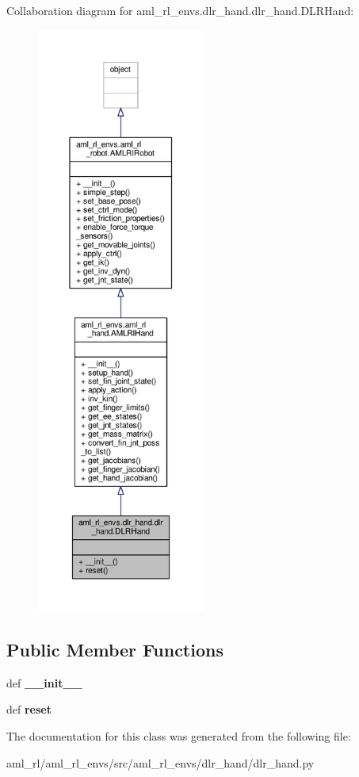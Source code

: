 Collaboration diagram for aml\-\_\-rl\-\_\-envs.\-dlr\-\_\-hand.\-dlr\-\_\-hand.\-D\-L\-R\-Hand\-:
\nopagebreak
\begin{figure}[H]
\begin{center}
\leavevmode
\includegraphics[height=550pt]{classaml__rl__envs_1_1dlr__hand_1_1dlr__hand_1_1_d_l_r_hand__coll__graph}
\end{center}
\end{figure}
\subsection*{Public Member Functions}
\begin{DoxyCompactItemize}
\item 
\hypertarget{classaml__rl__envs_1_1dlr__hand_1_1dlr__hand_1_1_d_l_r_hand_a0dfced3643c6d7d59ca5d88761c02fed}{def {\bfseries \-\_\-\-\_\-init\-\_\-\-\_\-}}\label{classaml__rl__envs_1_1dlr__hand_1_1dlr__hand_1_1_d_l_r_hand_a0dfced3643c6d7d59ca5d88761c02fed}

\item 
\hypertarget{classaml__rl__envs_1_1dlr__hand_1_1dlr__hand_1_1_d_l_r_hand_a85d50e4ae5cdab3bf9dfc4e81dc17d02}{def {\bfseries reset}}\label{classaml__rl__envs_1_1dlr__hand_1_1dlr__hand_1_1_d_l_r_hand_a85d50e4ae5cdab3bf9dfc4e81dc17d02}

\end{DoxyCompactItemize}


The documentation for this class was generated from the following file\-:\begin{DoxyCompactItemize}
\item 
aml\-\_\-rl/aml\-\_\-rl\-\_\-envs/src/aml\-\_\-rl\-\_\-envs/dlr\-\_\-hand/dlr\-\_\-hand.\-py\end{DoxyCompactItemize}

